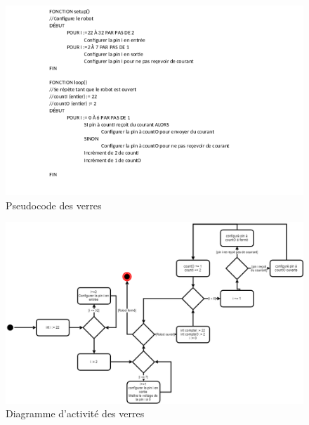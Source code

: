 \begin{figure}[h!]
    \centering
    \includegraphics[width=\linewidth]{img/s2/code/pseudo-verres}
    \caption{Pseudocode des verres}
    \label{fig:s2-code-pseudo-verres}
\end{figure}

\begin{figure}[h!]
    \centering
    \includegraphics[width=\linewidth]{img/s2/code/UML-VERRES}
    \caption{Diagramme d'activité des verres}
    \label{fig:s2-code-UML-VERRES}
\end{figure}
